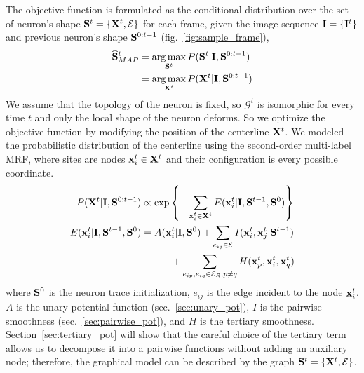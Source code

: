 \documentclass{article}
\DeclareMathOperator*{\argmax}{arg\,max}
\begin{document}
The objective function is formulated as the conditional distribution over the set of neuron's shape ${\bf S}^t = \{ {\bf X}^t, \mathcal{E} \}$ for each frame, given the image sequence ${\bf I} = \{ {\bf I}^t \}$ and previous neuron's shape ${\bf S}^{0:t-1}$ (fig.~\ref{fig:sample_frame}),
\small\begin{equation}
\begin{aligned}
\widehat{\bf S}^t_{MAP} & = \argmax_{{\bf S}^t} P({\bf S}^t|{\bf I},{\bf S}^{0:t-1}) \\
& = \argmax_{{\bf X}^t} P( {\bf X}^t | {\bf I},{\bf S}^{0:t-1} )
\end{aligned}
\end{equation}
We assume that the topology of the neuron is fixed, so $\mathcal{G}^t$ is isomorphic for every time $t$ and only the local shape of the neuron deforms. So we optimize the objective function by modifying the position of the centerline ${\bf X}^t$. We modeled the probabilistic distribution of the centerline using the second-order multi-label MRF, where sites are nodes ${\bf x}_i^t \in {\bf X}^t$ and their configuration is every possible coordinate. 
\small \begin{equation} \label{eq:objfunc}
\begin{aligned}
P( {\bf X}^t | {\bf I}, {\bf S}^{0:t-1} ) &\propto \exp \left\{-\sum_{{\bf x}_i^t \in {\bf X}^t} E( {\bf x}_i^t | {\bf I}, {\bf S}^{t-1}, {\bf S}^0) \right\} \\
E( {\bf x}_i^t | {\bf I}, {\bf S}^{t-1}, {\bf S}^0) &= A({\bf x}_i^t|{\bf I},{\bf S}^0) + \sum_{e_{ij} \in \mathcal{E}} I({\bf x}_i^t,{\bf x}_j^t | {\bf S}^{t-1}) \\
& \hspace{3em}+ \sum_{e_{ip},e_{iq} \in \mathcal{E}_R, p \neq q} H({\bf x}_p^t,{\bf x}_i^t,{\bf x}_q^t)
\end{aligned}
\end{equation}
where ${\bf S}^0$ is the neuron trace initialization, $e_{ij}$ is the edge incident to the node ${\bf x}_i^t$. $A$ is the unary potential function (sec.~\ref{sec:unary_pot}), $I$ is the pairwise smoothness (sec.~\ref{sec:pairwise_pot}), and $H$ is the tertiary smoothness. Section~\ref{sec:tertiary_pot} will show that the careful choice of the tertiary term allows us to decompose it into a pairwise functions without adding an auxiliary node; therefore, the graphical model can be described by the graph ${\bf S}^t = \{ {\bf X}^t, \mathcal{E} \}$.
\end{document}
